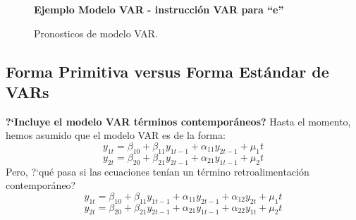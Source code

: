 \begin{figure}[H]
	\centering
	\textbf{Ejemplo Modelo VAR - instrucci\'on VAR para \textquotedblleft e\textquotedblright}\par\medskip
	\caption{Pronosticos de modelo VAR.}\label{fig45}
\end{figure}

\pagebreak\subsection{Forma Primitiva versus Forma Estándar de VARs}	
	\textbf{?`Incluye el modelo VAR t\'erminos contempor\'aneos?}
	Hasta el momento, hemos asumido que el modelo VAR es de la forma:\\
	\begin{equation*}
	y_{1t} = \beta_{10} + \beta_{11} y_{1t-1} + \alpha_{11} y_{2t-1} + \mu_1t
	\end{equation*}
	\begin{equation*}
	y_{2t} = \beta_{20} + \beta_{21} y_{2t-1} + \alpha_{21} y_{1t-1} + \mu_2t
	\end{equation*}
	Pero, ?`qu\'e pasa si las ecuaciones ten\'{i}an un t\'ermino retroalimentaci\'on contempor\'aneo?\\
	\begin{equation*}
	y_{1t} = \beta_{10} + \beta_{11} y_{1t-1} + \alpha_{11} y_{2t-1} + \alpha_{12} y_{2t} + \mu_1t
	\end{equation*}
	\begin{equation*}
	y_{2t} = \beta_{20} + \beta_{21} y_{2t-1} + \alpha_{21} y_{1t-1} + \alpha_{22} y_{1t} + \mu_2t
	\end{equation*}

